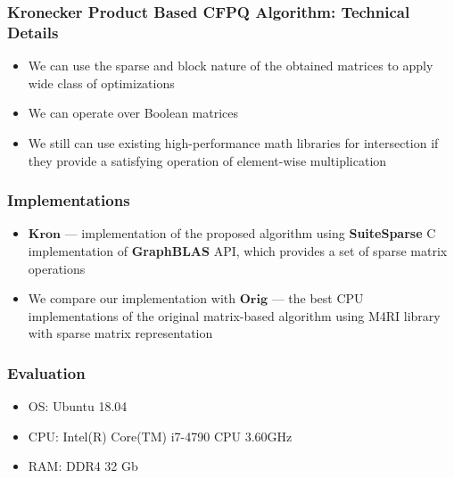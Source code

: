 \documentclass[xcolor=table]{beamer}
\begin{document}
  \begin{frame}[fragile] \frametitle{Kronecker Product Based CFPQ Algorithm: Technical Details}
    \begin{itemize}
      \item We can use the sparse and block nature of the obtained matrices to apply wide class of optimizations
      \item We can operate over Boolean matrices
      \item We still can use existing high-performance math libraries for intersection if they provide a satisfying operation of element-wise multiplication
    \end{itemize}
  \end{frame}

\begin{frame}[fragile] \frametitle{Implementations}

\begin{itemize}
	\item $\textbf{Kron}$ --- implementation of the proposed algorithm using \textbf{SuiteSparse} C implementation of \textbf{GraphBLAS} API, which provides a set of sparse matrix operations
	\pause
	\item We compare our implementation with $\textbf{Orig}$ --- the best CPU implementations of the original matrix-based algorithm using M4RI library with sparse matrix representation
\end{itemize}
\end{frame}

\begin{frame} \frametitle{Evaluation}
\begin{itemize}
	\item OS: Ubuntu 18.04
	\item CPU: Intel(R) Core(TM) i7-4790 CPU 3.60GHz
	\item RAM: DDR4 32 Gb
\end{itemize}
\end{frame}
\end{document}
